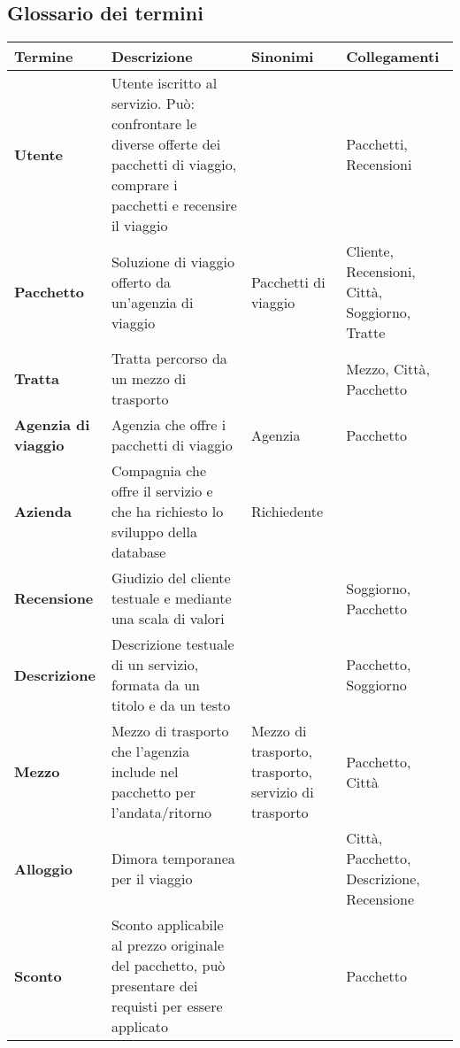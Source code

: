 \subsection{Glossario dei termini}
\begin{tabularx}{\textwidth}{p{} X p{} p{}}
    \toprule
    \textbf{Termine} & \textbf{Descrizione} & \textbf{Sinonimi} & \textbf{Collegamenti} \\
    \midrule
    \textbf{Utente} & Utente iscritto al servizio. Può: confrontare le diverse offerte dei pacchetti di viaggio, comprare i pacchetti e recensire il viaggio & & Pacchetti, Recensioni
    \\\midrule
    \textbf{Pacchetto} & Soluzione di viaggio offerto da un'agenzia di viaggio & Pacchetti di viaggio & Cliente, Recensioni, Città, Soggiorno, Tratte
    \\\midrule
    \textbf{Tratta} & Tratta percorso da un mezzo di trasporto & & Mezzo, Città, Pacchetto
    \\\midrule
    \textbf{Agenzia di viaggio} & Agenzia che offre i pacchetti di viaggio & Agenzia & Pacchetto
    \\\midrule
    \textbf{Azienda} & Compagnia che offre il servizio e che ha richiesto lo sviluppo della database & Richiedente &
    \\\midrule
    \textbf{Recensione} & Giudizio del cliente testuale e mediante una scala di valori & & Soggiorno, Pacchetto
    \\\midrule
    \textbf{Descrizione} & Descrizione testuale di un servizio, formata da un titolo e da un testo & & Pacchetto, Soggiorno
    \\\midrule
    \textbf{Mezzo} & Mezzo di trasporto che l'agenzia include nel pacchetto per l'andata/ritorno & Mezzo di trasporto, trasporto, servizio di trasporto & Pacchetto, Città
    \\\midrule
    \textbf{Alloggio} & Dimora temporanea per il viaggio & & Città, Pacchetto, Descrizione, Recensione
    \\\midrule
    \textbf{Sconto} & Sconto applicabile al prezzo originale del pacchetto, può presentare dei requisti per essere applicato & & Pacchetto
    \\
    \bottomrule
\end{tabularx}

